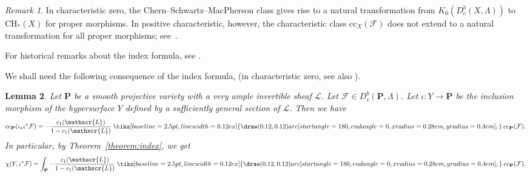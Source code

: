 \documentclass[english]{smfart}
\renewcommand{\mathbb}{\mathbf}
\newcommand{\capprod}{\mathbin{
  \tikz[baseline=\the\dimexpr\fontdimen22\textfont2\relax, line width=0.12ex] {
    \draw (0.12,0.12) arc[start angle=180, end angle=0, x radius=0.28em, y radius=0.4em];
  }
}}
\theoremstyle{remark}
\newtheorem{remark}{Remark}[subsection]
\theoremstyle{plain}
\newtheorem{lemma}[remark]{Lemma}
\theoremstyle{definition}
\numberwithin{equation}{remark}
\theoremstyle{void}
\begin{document}
\begin{remark}
In characteristic zero, the Chern--Schwartz--MacPherson class
gives rise to a natural transformation from \(K_0(D^b_c(X,\Lambda))\)
to \(\mathrm{CH}_{\ast}(X)\) for proper morphisms.  In
positive characteristic, however, the characteristic class
\(\mathrm{cc}_{X}(\mathcal{F})\) does not extend to a natural
transformation for all proper morphisms;
see~\cite[Example~6.10]{saito_takeshi_characteristic-cycle-and-singular-support}.

For historical remarks about the index formula,
see \cite[Chapter 9, Note]{kashiwara-schapira_sheaves-on-manifolds}.
\end{remark}

We shall need the following consequence of the index formula,
(in characteristic zero, see also \cite[Proposition~2.6]{aluffi_euler-characteristi-generali-linear-sections}).

\begin{lemma}\label{lemma:cc-hypersurface}
Let \(\mathbb{P}\) be a smooth projective variety with a very ample
invertible sheaf \(\mathscr{L}\).  Let
\(\mathcal{F} \in D^b_c(\mathbb{P},\Lambda)\).  Let
\(\iota\colon Y \to \mathbb{P}\) be the inclusion morphism of the
hypersurface \(Y\) defined by a sufficiently general section of
\(\mathscr{L}\).  Then we have
\[
\mathrm{cc}_{\mathbb{P}}(\iota_{\ast}\iota^{\ast}\mathcal{F}) = -\frac{c_1(\mathscr{L})}{1 - c_1(\mathscr{L})} \capprod \mathrm{cc}_{\mathbb{P}}(\mathcal{F}).
\]
In particular, by Theorem~\ref{theorem:index}, we get
\[
\chi(Y, \iota^{\ast}\mathcal{F}) = \int_{\mathbb{P}} -\frac{c_1(\mathscr{L})}{1 - c_1(\mathscr{L})} \capprod \mathrm{cc}_{\mathbb{P}}(\mathcal{F}).
\]
\end{lemma}
\end{document}
